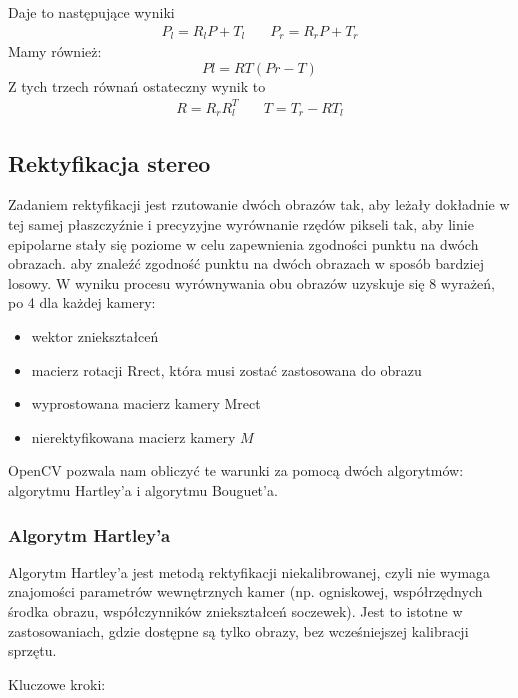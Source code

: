 \documentclass[magisterska]{pracadypl}
\begin{document}
Daje to następujące wyniki
\[
\begin{array}{cc}
P_l = R_l P + T_l & \quad P_r = R_r P + T_r
\end{array}
\]
Mamy również:
\[Pl=RT(Pr-T)\]
Z tych trzech równań ostateczny wynik to
\[
\begin{array}{cc}
R = R_r R_l^T & \quad T = T_r - R T_l
\end{array}
\]

\subsection{Rektyfikacja stereo}

Zadaniem rektyfikacji jest rzutowanie dwóch obrazów tak, aby leżały dokładnie w tej samej płaszczyźnie i precyzyjne wyrównanie rzędów pikseli tak, aby linie epipolarne stały się poziome w celu zapewnienia zgodności punktu na dwóch obrazach.
aby znaleźć zgodność punktu na dwóch obrazach w sposób bardziej losowy.
W wyniku procesu wyrównywania obu obrazów uzyskuje się 8 wyrażeń, po 4 dla każdej kamery:

\begin{itemize}
  \item wektor zniekształceń
  \item macierz rotacji Rrect, która musi zostać zastosowana do obrazu
  \item wyprostowana macierz kamery Mrect
  \item nierektyfikowana macierz kamery $M$
\end{itemize}

OpenCV pozwala nam obliczyć te warunki za pomocą dwóch algorytmów: algorytmu Hartley'a
i algorytmu Bouguet'a.

\subsubsection{Algorytm Hartley'a}

Algorytm Hartley’a jest metodą rektyfikacji niekalibrowanej, czyli nie wymaga znajomości parametrów wewnętrznych kamer (np. ogniskowej, współrzędnych środka obrazu, współczynników zniekształceń soczewek). Jest to istotne w zastosowaniach, gdzie dostępne są tylko obrazy, bez wcześniejszej kalibracji sprzętu.

\bigskip

Kluczowe kroki:
\end{document}
